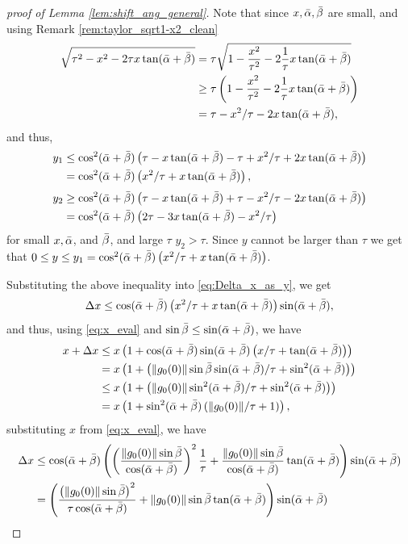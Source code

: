 \documentclass[12pt]{article}
\theoremstyle{remark}
\begin{document}
\begin{appendices}
\begin{proof}[proof of Lemma \ref{lem:shift_ang_general}]
Note that since $x,\bar{\alpha},\bar{\beta}$ are small, and using Remark \ref{rem:taylor_sqrt1-x2_clean}
\begin{align}
\sqrt{\tau^2-x^2-2\tau x\tan(\bar{\alpha}+\bar{\beta})} &= \tau\sqrt{1-\frac{x^2}{\tau^2}-2\frac{1}{\tau} x\tan(\bar{\alpha}+\bar{\beta})} 
\\&
\geq
\tau \left(1-\frac{x^2}{\tau^2}-2\frac{1}{\tau} x\tan(\bar{\alpha}+\bar{\beta})\right) 
\\&
= \tau- x^2/\tau-2 x\tan(\bar{\alpha}+\bar{\beta}),
\end{align}
and thus,
\begin{align*}
y_1 &\leq \cos^2(\bar{\alpha}+\bar{\beta}) \left(\tau - x\tan(\bar{\alpha}+\bar{\beta})-\tau+ x^2/\tau + 2 x \tan (\bar{\alpha}+\bar{\beta})\right)\\
&= \cos^2(\bar{\alpha}+\bar{\beta}) \left( x^2/\tau +  x \tan (\bar{\alpha}+\bar{\beta})\right),    
\end{align*}
\begin{align*}
y_2 &\geq \cos^2(\bar{\alpha}+\bar{\beta}) \left(\tau - x\tan(\bar{\alpha}+\bar{\beta})+\tau- x^2/\tau-2 x\tan(\bar{\alpha}+\bar{\beta})\right) \\
&= \cos^2(\bar{\alpha}+\bar{\beta}) \left(2\tau - 3x\tan(\bar{\alpha}+\bar{\beta})- x^2/\tau\right)    
\end{align*}
for small $x,\bar{\alpha}$, and $\bar{\beta}$, and large $\tau$ $y_2>\tau$. Since $y$ cannot be larger than $\tau$ we get that  $0\leq y \leq y_1 = \cos^2(\bar{\alpha}+\bar{\beta}) \left( x^2/\tau +  x \tan (\bar{\alpha}+\bar{\beta})\right)$.

Substituting the above inequality into \eqref{eq:Delta_x_as_y}, we get
\[
\Delta x \leq\cos(\bar{\alpha}+\bar{\beta}) \left( x^2/\tau +  x \tan (\bar{\alpha}+\bar{\beta})\right) \sin(\bar{\alpha}+\bar{\beta}),
\]
and thus, using \eqref{eq:x_eval} and $\sin \bar{\beta} \leq \sin(\bar{\alpha}+\bar{\beta})$, we have
\begin{align}
x + \Delta x &\leq x \left(1+\cos(\bar{\alpha}+\bar{\beta}) \sin(\bar{\alpha}+\bar{\beta})\left( x/\tau +   \tan (\bar{\alpha}+\bar{\beta})\right) \right)
\\&=
x \left(1+\left( \|g_0(0)\|\sin{\bar{\beta}}\sin(\bar{\alpha}+\bar{\beta})/\tau + \sin^2 (\bar{\alpha}+\bar{\beta})\right) \right)
\\&\leq
x \left(1+\left( \|g_0(0)\|\sin^2(\bar{\alpha}+\bar{\beta})/\tau + \sin^2 (\bar{\alpha}+\bar{\beta})\right) \right)
\\&=
x \left(1+\sin^2(\bar{\alpha}+\bar{\beta})\left( \|g_0(0)\|/\tau + 1\right) \right)
,
\end{align}
substituting $x$ from \eqref{eq:x_eval}, we have
\begin{align}
\Delta x &\leq\cos(\bar{\alpha}+\bar{\beta}) \left( \left(\frac{\|g_0(0)\|\sin{\bar{\beta}}}{\cos(\bar{\alpha}+\bar{\beta})}\right)^2 \frac{1}{\tau}+  \frac{\|g_0(0)\|\sin{\bar{\beta}}}{\cos(\bar{\alpha}+\bar{\beta})} \tan (\bar{\alpha}+\bar{\beta})\right) \sin(\bar{\alpha}+\bar{\beta})
\\ &= \left( \frac{\left(\|g_0(0)\|\sin{\bar{\beta}}\right)^2}{\tau\cos(\bar{\alpha}+\bar{\beta})} +  \|g_0(0)\|\sin{\bar{\beta}} \tan (\bar{\alpha}+\bar{\beta})\right) \sin(\bar{\alpha}+\bar{\beta})
\end{align}


\end{proof}
\end{appendices}
\end{document}
